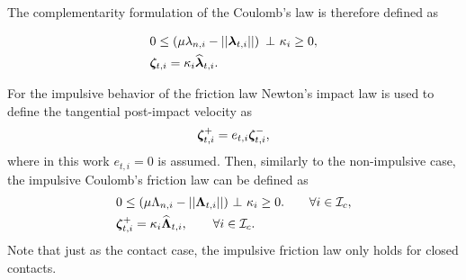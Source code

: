 \documentclass[DC2017114Bouma.tex]{subfiles}
\begin{document}
The complementarity formulation of the Coulomb's law is therefore defined as

\begin{align}
&0\leq \left(\mu\lambda_{n,i} - ||\lambdab_{t,i}||\right)\ \bot\ \kappa_i \geq 0,\label{eq:coulomb1}\\
&\zetab_{t,i} = \kappa_i\widehat{\lambdab}_{t,i}.\label{eq:coulomb2}
\end{align}

For the impulsive behavior of the friction law Newton's impact law is used to define the tangential post-impact velocity as
\begin{align}
\boldsymbol{\zeta}^+_{t,i} = e_{t,i}\boldsymbol{\zeta}^-_{t,i},
\end{align}
where in this work $e_{t,i}=0$ is assumed. Then, similarly to the non-impulsive case, the impulsive Coulomb's friction law can be defined as
\begin{align}
&0 \leq (\mu\Lambda_{n,i} - ||\boldsymbol{\Lambda}_{t,i}||)\ \bot\ \kappa_i \geq 0. \qquad \forall i\in\mathcal{I}_c,\label{eq:coulombimp1}\\
&\boldsymbol{\zeta}_{t,i}^+ = \kappa_i\widehat{\boldsymbol{\Lambda}}_{t,i},\qquad \forall i\in\mathcal{I}_c.\label{eq:coulombimp2}
\end{align}
Note that just as the contact case, the impulsive friction law only holds for closed contacts.
\end{document}

